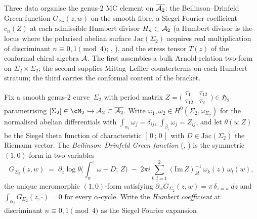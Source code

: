 Three data organise the genus-$2$ MC element on $\overline{\mathcal{A}_2}$:
the Beilinson--Drinfeld Green function $G_{\Sigma_2}(z,w)$ on the
smooth fibre, a Siegel Fourier coefficient $c_n(Z)$ at each admissible
Humbert divisor $H_n\subset\mathcal{A}_2$ \textup{(}a Humbert divisor is the
locus where the polarised abelian surface $\mathrm{Jac}(\Sigma_2)$
acquires real multiplication of discriminant $n\equiv 0,1\pmod 4$;
\cite{vdG1988}, \cite{Humbert1899}\textup{)}, and the stress tensor
$T(z)$ of the conformal chiral algebra $\mathcal{A}$. The first assembles a
bulk Arnold-relation two-form on $\Sigma_2\times\Sigma_2$; the second
supplies Mittag--Leffler counterterms on each Humbert stratum; the
third carries the conformal content of the bracket.

\begin{proposition}
\label{prop:theta-A-genus2}
Fix a smooth genus-$2$ curve~$\Sigma_{2}$ with period matrix
$Z=\bigl(\begin{smallmatrix}\tau_1 & \tau_{12}\\ \tau_{12} & \tau_2
\end{smallmatrix}\bigr)\in\mathfrak{H}_2$ parametrising
$[\Sigma_{2}]\in\cM_{2}\hookrightarrow\cA_2\subset\overline{\cA_2}$.
Write $\omega_1,\omega_2\in H^{0}(\Sigma_2,\omega_{\Sigma_2})$ for
the normalised abelian differentials with
$\int_{\alpha_i}\omega_j=\delta_{ij}$, $\int_{\beta_i}\omega_j=Z_{ij}$,
and let $\theta(u;Z)$ be the Siegel theta function of characteristic
$[\,0\,;\,0\,]$ with $D\in\mathrm{Jac}(\Sigma_2)$ the Riemann vector.
The \emph{Beilinson--Drinfeld Green function}
\textup{(}\cite[§16.5]{FrenkelBenZvi}, \cite{Arakelov1974}\textup{)}
is the symmetric $(1,0)$-form in two variables
\begin{equation}\label{eq:bd-green-g2}
G_{\Sigma_2}(z,w)\;=\;
\partial_z\log\theta\!\bigl(\!\textstyle\int_{w}^{z}\omega-D;\,Z
\bigr)
\;-\;
2\pi i\sum_{k,l=1}^{2}(\mathrm{Im}\,Z)^{-1}_{kl}\,
\omega_k(z)\,\overline{\omega_l(w)},
\end{equation}
the unique meromorphic $(1,0)$-form satisfying
$\bar\partial_w G_{\Sigma_2}(z,w) = \pi\,\delta_{z=w}\,dz$ and
$\int_{\alpha_j}G_{\Sigma_2}(z,\cdot)=0$ for every $\alpha$-cycle.
Write the \emph{Humbert coefficient} at discriminant
$n\equiv 0,1\pmod 4$ as the Siegel Fourier expansion

\end{proposition}
